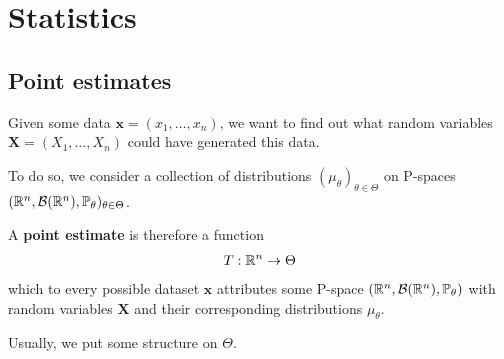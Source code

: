 \section{Statistics}

\subsection{Point estimates}
Given some data $\bm{x} = (x_{1}, \ldots, x_{n})$, we want to find out what random variables $\bm{X} = (X_{1}, \ldots, X_{n})$ could have generated this data.

To do so, we consider a collection of distributions $(\mu_{\theta})_{\theta \in \Theta}$ on P-spaces $(\mathbb{R}^{n},\mathcal{B}(\mathbb{R}^{n}),\mathbb{P}_{\theta})_{\theta \in \Theta}$.
 
A \textbf{point estimate} is therefore a function
\begin{align*}
  T: \mathbb{R}^{n} \to \Theta
\end{align*}
which to every possible dataset $\bm{x}$ attributes some P-space $(\mathbb{R}^{n},\mathcal{B}(\mathbb{R}^{n}),\mathbb{P}_{\theta})$ with random variables $\bm{X}$ and their corresponding distributions $\mu_{\theta}$.

Usually, we put some structure on $\Theta$.
